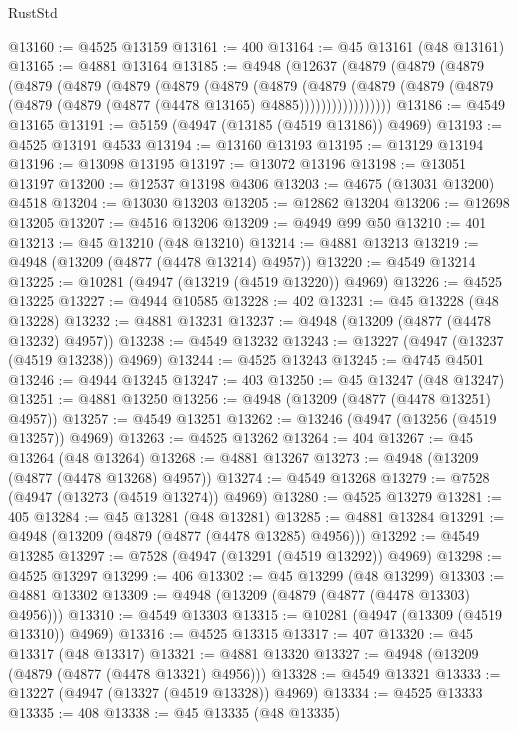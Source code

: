 \begin{lexlean}{RustStd}
\begin{coremodule}
@13160 := @4525 @13159
@13161 := 400
@13164 := @45 @13161 (@48 @13161)
@13165 := @4881 @13164
@13185 := @4948
    (@12637
      (@4879
        (@4879
          (@4879
            (@4879
              (@4879
                (@4879
                  (@4879
                    (@4879
                      (@4879
                        (@4879
                          (@4879
                            (@4879 (@4879 (@4879 (@4879 (@4877 (@4478 @13165) @4885)))))))))))))))))
@13186 := @4549 @13165
@13191 := @5159 (@4947 (@13185 (@4519 @13186)) @4969)
@13193 := @4525 @13191 @4533
@13194 := @13160 @13193
@13195 := @13129 @13194
@13196 := @13098 @13195
@13197 := @13072 @13196
@13198 := @13051 @13197
@13200 := @12537 @13198 @4306
@13203 := @4675 (@13031 @13200) @4518
@13204 := @13030 @13203
@13205 := @12862 @13204
@13206 := @12698 @13205
@13207 := @4516 @13206
@13209 := @4949 @99 @50
@13210 := 401
@13213 := @45 @13210 (@48 @13210)
@13214 := @4881 @13213
@13219 := @4948 (@13209 (@4877 (@4478 @13214) @4957))
@13220 := @4549 @13214
@13225 := @10281 (@4947 (@13219 (@4519 @13220)) @4969)
@13226 := @4525 @13225
@13227 := @4944 @10585
@13228 := 402
@13231 := @45 @13228 (@48 @13228)
@13232 := @4881 @13231
@13237 := @4948 (@13209 (@4877 (@4478 @13232) @4957))
@13238 := @4549 @13232
@13243 := @13227 (@4947 (@13237 (@4519 @13238)) @4969)
@13244 := @4525 @13243
@13245 := @4745 @4501
@13246 := @4944 @13245
@13247 := 403
@13250 := @45 @13247 (@48 @13247)
@13251 := @4881 @13250
@13256 := @4948 (@13209 (@4877 (@4478 @13251) @4957))
@13257 := @4549 @13251
@13262 := @13246 (@4947 (@13256 (@4519 @13257)) @4969)
@13263 := @4525 @13262
@13264 := 404
@13267 := @45 @13264 (@48 @13264)
@13268 := @4881 @13267
@13273 := @4948 (@13209 (@4877 (@4478 @13268) @4957))
@13274 := @4549 @13268
@13279 := @7528 (@4947 (@13273 (@4519 @13274)) @4969)
@13280 := @4525 @13279
@13281 := 405
@13284 := @45 @13281 (@48 @13281)
@13285 := @4881 @13284
@13291 := @4948 (@13209 (@4879 (@4877 (@4478 @13285) @4956)))
@13292 := @4549 @13285
@13297 := @7528 (@4947 (@13291 (@4519 @13292)) @4969)
@13298 := @4525 @13297
@13299 := 406
@13302 := @45 @13299 (@48 @13299)
@13303 := @4881 @13302
@13309 := @4948 (@13209 (@4879 (@4877 (@4478 @13303) @4956)))
@13310 := @4549 @13303
@13315 := @10281 (@4947 (@13309 (@4519 @13310)) @4969)
@13316 := @4525 @13315
@13317 := 407
@13320 := @45 @13317 (@48 @13317)
@13321 := @4881 @13320
@13327 := @4948 (@13209 (@4879 (@4877 (@4478 @13321) @4956)))
@13328 := @4549 @13321
@13333 := @13227 (@4947 (@13327 (@4519 @13328)) @4969)
@13334 := @4525 @13333
@13335 := 408
@13338 := @45 @13335 (@48 @13335)

\end{coremodule}
\end{lexlean}

